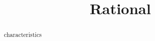 \documentclass{ximera}
\title{Rational}
\begin{document}
\begin{abstract}
characteristics
\end{abstract}
\maketitle
\end{document}
